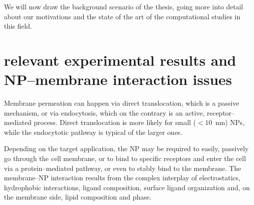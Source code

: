 We will now draw the background scenario of the thesis, going more into detail about our motivations and the state of the art of the computational studies in this field.

\tocless\section{relevant experimental results and NP--membrane interaction issues}
Membrane permeation can happen via direct translocation, which is a passive mechanism, or via endocytosis, which on the contrary is an active, receptor--mediated process. Direct translocation is more likely for small ($< 10$~nm) \acp{NP}, while the endocytotic pathway is typical of the larger ones.

Depending on the target application, the \ac{NP} may be required to easily, passively go through the cell membrane, or to bind to specific receptors and enter the cell via a protein--mediated pathway, or even to stably bind to the membrane. The membrane--\ac{NP} interaction results from the complex interplay of electrostatics, hydrophobic interactions, ligand composition, surface ligand organization and, on the membrane side, lipid composition and phase.

